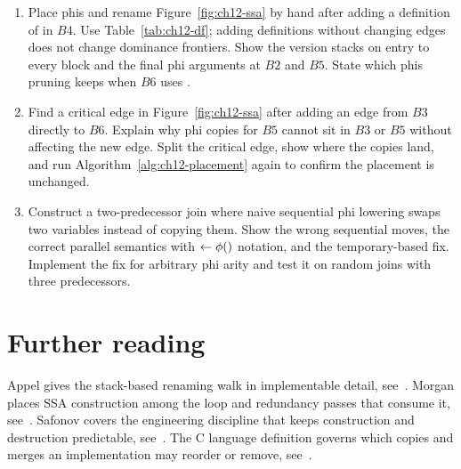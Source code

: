 \begin{enumerate}
\item \label{ex:ch12-place-rename} Place phis and rename Figure~\ref{fig:ch12-ssa} by hand after adding a definition of  in $B4$.
Use Table~\ref{tab:ch12-df}; adding definitions without changing edges does not change dominance frontiers.
Show the version stacks on entry to every block and the final phi arguments at $B2$ and $B5$.
State which  phis pruning keeps when $B6$ uses .
\item \label{ex:ch12-critical-edge} Find a critical edge in Figure~\ref{fig:ch12-ssa} after adding an edge from $B3$ directly to $B6$.
Explain why phi copies for $B5$ cannot sit in $B3$ or $B5$ without affecting the new edge.
Split the critical edge, show where the copies land, and run Algorithm~\ref{alg:ch12-placement} again to confirm the placement is unchanged.
\item \label{ex:ch12-lost-copy} Construct a two-predecessor join where naive sequential phi lowering swaps two variables instead of copying them.
Show the wrong sequential moves, the correct parallel semantics with $ \gets \phi()$ notation, and the temporary-based fix.
Implement the fix for arbitrary phi arity and test it on random joins with three predecessors.
\end{enumerate}

\section{Further reading}
\label{sec:ch12-reading}

Appel gives the stack-based renaming walk in implementable detail, see~\cite{appel-1998-modern}.
Morgan places SSA construction among the loop and redundancy passes that consume it, see~\cite{morgan-1998-optimizing}.
Safonov covers the engineering discipline that keeps construction and destruction predictable, see~\cite{safonov-2010-trustworthy}.
The C language definition governs which copies and merges an implementation may reorder or remove, see~\cite{wg14-2011-c11}.
